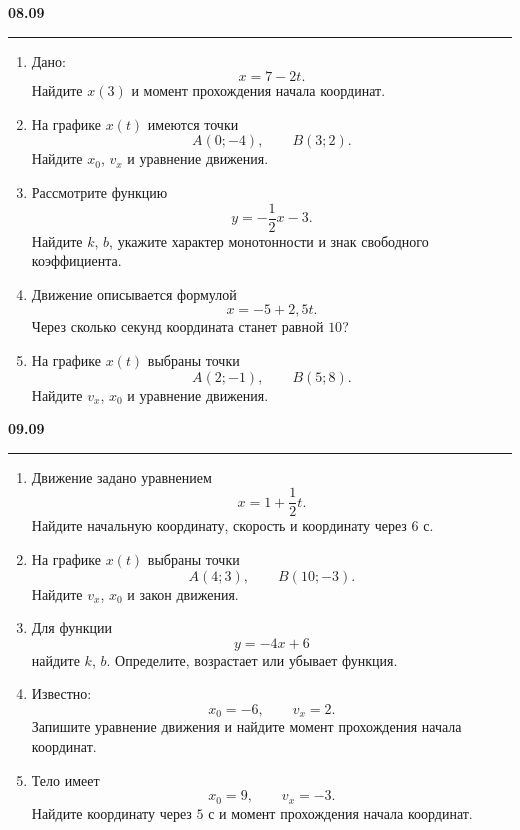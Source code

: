\documentclass[a4paper,12pt]{article}
\newcommand{\daytitle}[1]{%
  \vspace{0.7em}
  {\large\bfseries\color{darkaccent}#1}\par
  \vspace{0.2em}
  \noindent\color{accent}\rule{\linewidth}{0.4pt}\color{textgray}
  \vspace{0.3em}
}
\begin{document}

\daytitle{08.09}

\begin{enumerate}[label=\arabic*),leftmargin=*,itemsep=0.9em]

\item Дано:
\[
x=7-2t.
\]
Найдите \(x(3)\) и момент прохождения начала координат.

\item На графике \(x(t)\) имеются точки
\[
A(0;-4),\qquad B(3;2).
\]
Найдите \(x_0\), \(v_x\) и уравнение движения.

\item Рассмотрите функцию
\[
y=-\frac12x-3.
\]
Найдите \(k\), \(b\), укажите характер монотонности и знак свободного коэффициента.

\item Движение описывается формулой
\[
x=-5+2{,}5t.
\]
Через сколько секунд координата станет равной \(10\)?

\item На графике \(x(t)\) выбраны точки
\[
A(2;-1),\qquad B(5;8).
\]
Найдите \(v_x\), \(x_0\) и уравнение движения.

\end{enumerate}


\daytitle{09.09}

\begin{enumerate}[label=\arabic*),leftmargin=*,itemsep=0.9em]

\item Движение задано уравнением
\[
x=1+\frac12t.
\]
Найдите начальную координату, скорость и координату через \(6\) с.

\item На графике \(x(t)\) выбраны точки
\[
A(4;3),\qquad B(10;-3).
\]
Найдите \(v_x\), \(x_0\) и закон движения.

\item Для функции
\[
y=-4x+6
\]
найдите \(k\), \(b\). Определите, возрастает или убывает функция.

\item Известно:
\[
x_0=-6,\qquad v_x=2.
\]
Запишите уравнение движения и найдите момент прохождения начала координат.

\item Тело имеет
\[
x_0=9,\qquad v_x=-3.
\]
Найдите координату через \(5\) с и момент прохождения начала координат.

\end{enumerate}
\end{document}

